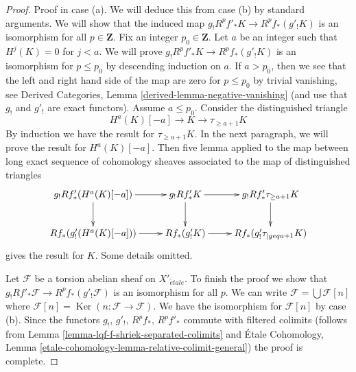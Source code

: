 \documentclass{stacks-project}
\theoremstyle{plain}
\theoremstyle{definition}
\theoremstyle{remark}
\numberwithin{equation}{subsection}
\def\etale{{\acute{e}tale}}
\def\Ker{\mathop{\mathrm{Ker}}}
\begin{document}
\begin{proof}
\medskip\noindent
Proof in case (a). We will deduce this from case (b) by standard arguments.
We will show that the induced map $g_! R^pf'_* K \to R^pf_*(g'_!K)$
is an isomorphism for all $p \in \mathbf{Z}$. Fix an integer
$p_0 \in \mathbf{Z}$. Let $a$ be an integer such that $H^j(K) = 0$
for $j < a$. We will prove $g_! R^pf'_* K \to R^pf_*(g'_!K)$
is an isomorphism for $p \leq p_0$ by descending induction on $a$. If
$a > p_0$, then we see that the left and right hand side of
the map are zero for $p \leq p_0$ by trivial vanishing, see
Derived Categories, Lemma \ref{derived-lemma-negative-vanishing}
(and use that $g_!$ and $g'_!$ are exact functors).
Assume $a \leq p_0$. Consider the distinguished triangle
$$
H^a(K)[-a] \to K \to \tau_{\geq a + 1}K
$$
By induction we have the result for $\tau_{\geq a + 1}K$.
In the next paragraph, we will prove the result for $H^a(K)[-a]$.
Then five lemma applied to the map between
long exact sequence of cohomology sheaves
associated to the map of distinguished triangles
$$
\xymatrix{
g_! Rf'_*(H^a(K)[-a]) \ar[d] \ar[r] &
g_! Rf'_* K \ar[r] \ar[d] &
g_! Rf'_* \tau_{\geq a + 1} K \ar[d] \\
Rf_*(g'_!(H^a(K)[-a])) \ar[r] &
Rf_*(g'_!K) \ar[r] &
Rf_*(g'_!\tau_{|geq a + 1}K)
}
$$
gives the result for $K$. Some details omitted.

\medskip\noindent
Let $\mathcal{F}$ be a torsion abelian sheaf on $X'_\etale$.
To finish the proof we show that
$g_! Rf'_*\mathcal{F} \to R^pf_*(g'_!\mathcal{F})$
is an isomorphism for all $p$.
We can write $\mathcal{F} = \bigcup \mathcal{F}[n]$ where
$\mathcal{F}[n] = \Ker(n : \mathcal{F} \to \mathcal{F})$.
We have the isomorphism for $\mathcal{F}[n]$ by case (b).
Since the functors $g_!$, $g'_!$, $R^pf_*$, $R^pf'_*$ commute
with filtered colimits (follows from
Lemma \ref{lemma-lqf-f-shriek-separated-colimits} and
\'Etale Cohomology, Lemma
\ref{etale-cohomology-lemma-relative-colimit-general})
the proof is complete.
\end{proof}
\end{document}

